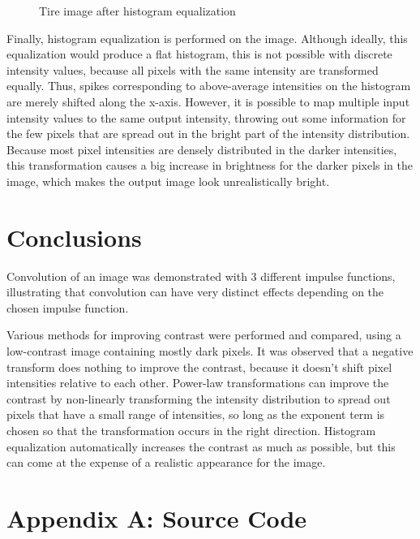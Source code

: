 \documentclass{sydeStyle}
\begin{document}
 \begin{figure}
	\begin{center}
	\end{center}
	\caption{Tire image after histogram equalization}
\end{figure}
Finally, histogram equalization is performed on the image.
Although ideally, this equalization would produce a flat histogram, this is not
possible with discrete intensity values, because all pixels with the same
intensity are transformed equally.
Thus, spikes corresponding to above-average intensities on the histogram are
merely shifted along the x-axis.
However, it is possible to map multiple input intensity values to the same
output intensity, throwing out some information for the few pixels that are
spread out in the bright part of the intensity distribution.
Because most pixel intensities are densely distributed in the darker
intensities, this transformation causes a big increase in brightness for the
darker pixels in the image, which makes the output image look unrealistically
bright.

\section*{Conclusions}
Convolution of an image was demonstrated with 3 different impulse functions,
illustrating that convolution can have very distinct effects depending on the
chosen impulse function.

Various methods for improving contrast were performed and compared, using a
low-contrast image containing mostly dark pixels.
It was observed that a negative transform does nothing to improve the contrast,
because it doesn't shift pixel intensities relative to each other.
Power-law transformations can improve the contrast by non-linearly transforming
the intensity distribution to spread out pixels that have a small range of
intensities, so long as the exponent term is chosen so that the transformation occurs in
the right direction.
Histogram equalization automatically increases the contrast as much as possible,
but this can come at the expense of a realistic appearance for the image.

\section*{Appendix A: Source Code}
\lstset{
	language=Octave,
	basicstyle=\scriptsize,
	tabsize=2,
	breaklines=true,
	breakatwhitespace=false,        %
	title=\lstname,
}





\end{document}
